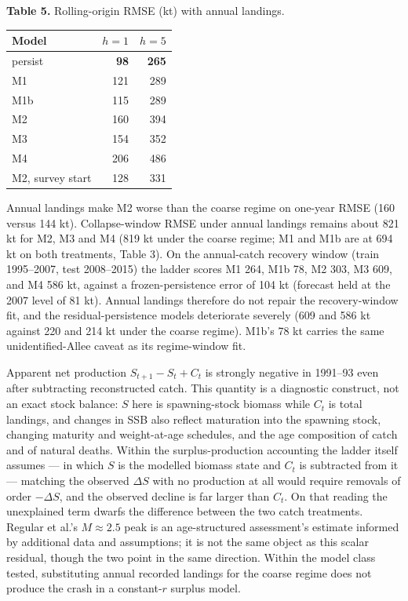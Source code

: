 \documentclass[11pt]{article}
\begin{document}
\textbf{Table 5.} Rolling-origin RMSE (kt) with annual landings.

\begin{longtable}[]{@{}lrr@{}}
\toprule\noalign{}
Model & \(h=1\) & \(h=5\) \\
\midrule\noalign{}
\endhead
\bottomrule\noalign{}
\endlastfoot
persist & \textbf{98} & \textbf{265} \\
M1 & 121 & 289 \\
M1b & 115 & 289 \\
M2 & 160 & 394 \\
M3 & 154 & 352 \\
M4 & 206 & 486 \\
M2, survey start & 128 & 331 \\
\end{longtable}

Annual landings make M2 worse than the coarse regime on one-year RMSE
(160 versus 144 kt). Collapse-window RMSE under annual landings remains
about 821 kt for M2, M3 and M4 (819 kt under the coarse regime; M1 and
M1b are at 694 kt on both treatments, Table 3). On the annual-catch recovery window (train 1995--2007, test 2008--2015)
the ladder scores M1 264, M1b 78, M2 303, M3 609, and M4 586 kt, against
a frozen-persistence error of 104 kt (forecast held at the 2007 level of
81 kt). Annual landings therefore do not repair the recovery-window fit,
and the residual-persistence models deteriorate severely (609 and 586 kt
against 220 and 214 kt under the coarse regime). M1b's 78 kt carries the
same unidentified-Allee caveat as its regime-window fit.

Apparent net production \(S_{t+1}-S_t+C_t\) is strongly negative in
1991--93 even after subtracting reconstructed catch. This quantity is a diagnostic construct, not an exact stock balance: \(S\) here is spawning-stock biomass while \(C_t\) is total
landings, and changes in SSB also reflect maturation into the spawning
stock, changing maturity and weight-at-age schedules, and the age
composition of catch and of natural deaths. Within the surplus-production
accounting the ladder itself assumes --- in which \(S\) is the modelled
biomass state and \(C_t\) is subtracted from it --- matching the observed
\(\Delta S\) with no production at all would require removals of order
\(-\Delta S\), and the observed decline is far larger than \(C_t\). On
that reading the unexplained term dwarfs the difference between the two
catch treatments.
Regular et al.'s \(M \approx 2.5\) peak is an age-structured assessment's
estimate informed by additional data and assumptions; it is not the same
object as this scalar residual, though the two point in the same
direction. Within the model class tested, substituting annual recorded landings
for the coarse regime does not produce the crash in a constant-\(r\)
surplus model.
\end{document}
